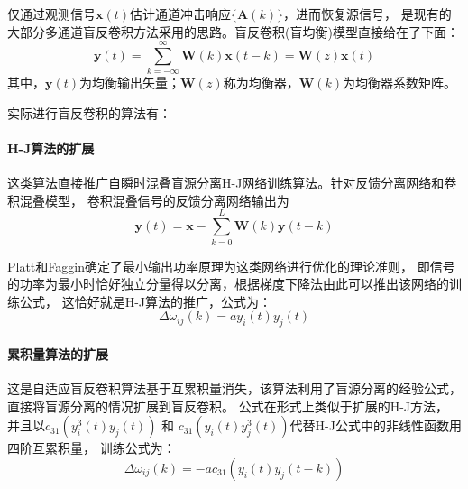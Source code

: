 仅通过观测信号$\bm{x}(t)$估计通道冲击响应$\{\bm{A}(k)\}$，进而恢复源信号，
是现有的大部分多通道盲反卷积方法采用的思路。盲反卷积(盲均衡)模型直接给在了下面：
\begin{equation}
\bm{y}(t) = \sum^\infty_{k=-\infty}\bm{W}(k)\bm{x}(t-k)=\bm{W}(z)\bm{x}(t)
\end{equation}
其中，$\bm{y}(t)$为均衡输出矢量；$\bm{W}(z)$称为均衡器，$\bm{W}(k)$为均衡器系数矩阵。

实际进行盲反卷积的算法有：
\paragraph*{H-J算法的扩展}
这类算法直接推广自瞬时混叠盲源分离H-J网络训练算法。针对反馈分离网络和卷积混叠模型，
卷积混叠信号的反馈分离网络输出为
\begin{equation}
\bm{y}(t)=\bm{x}-\sum^{L}_{k=0}\bm{W}(k)\bm{y}(t-k)
\end{equation}

Platt和Faggin确定了最小输出功率原理为这类网络进行优化的理论准则，
即信号的功率为最小时恰好独立分量得以分离，根据梯度下降法由此可以推出该网络的训练公式，
这恰好就是H-J算法的推广，公式为：
\begin{equation}
\Delta\omega_{ij}(k)=a y_i(t)y_j(t)
\end{equation}

\paragraph*{累积量算法的扩展}
这是自适应盲反卷积算法基于互累积量消失，该算法利用了盲源分离的经验公式，直接将盲源分离的情况扩展到盲反卷积。
公式在形式上类似于扩展的H-J方法，
并且以$c_{31}(y_i^3(t)y_j(t))$ 和 $c_{31}(y_i(t)y_j^3(t))$代替H-J公式中的非线性函数用四阶互累积量，
训练公式为：
\begin{equation}
\Delta\omega_{ij}(k)=-ac_{31}(y_i(t)y_j(t-k))
\end{equation}

